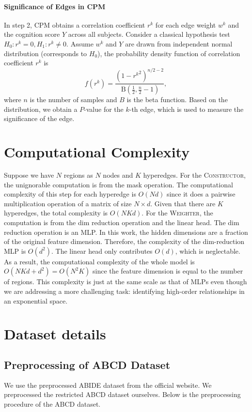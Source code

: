 \paragraph{Significance of Edges in CPM}
In step 2, CPM obtains a correlation coefficient $r^k$ for each edge weight $w^k$ and the cognition score $Y$ across all subjects. Consider a classical hypothesis test $H_0: r^k = 0, H_1: r^k \neq 0$. Assume $w^k$ and $Y$ are drawn from independent normal distribution (corresponds to $H_0$), the probability density function of correlation coefficient $r^k$ is
$$
f(r^k)=\frac{\left(1-{r^k}^2\right)^{n / 2-2}}{\mathrm{~B}\left(\frac{1}{2}, \frac{n}{2}-1\right)},
$$
where $n$ is the number of samples and $B$ is the beta function. Based on the distribution, we obtain a $P$-value for the $k$-th edge, which is used to measure the significance of the edge.

\section{Computational Complexity}
\label{app:complexity}
Suppose we have $N$ regions as $N$ nodes and $K$ hyperedges. For the \textsc{Constructor}, the unignorable computation is from the mask operation. The computational complexity of this step for each hyperedge is $O(Nd)$ since it does a pairwise multiplication operation of a matrix of size $N \times d$. Given that there are $K$ hyperedges, the total complexity is $O(NKd)$. For the \textsc{Weighter}, the computation is from the dim reduction operation and the linear head. The dim reduction operation is an MLP. In this work, the hidden dimensions are a fraction of the original feature dimension. Therefore, the complexity of the dim-reduction MLP is $O(d^2)$. The linear head only contributes $O(d)$, which is neglectable. 
As a result, the computational complexity of the whole model is $O(NKd + d^2) = O(N^2K)$ since the feature dimension is equal to the number of regions. This complexity is just at the same scale as that of MLPs even though we are addressing a more challenging task: identifying high-order relationships in an exponential space.

\section{Dataset details}
\label{app:dataset}
\subsection{Preprocessing of ABCD Dataset}
We use the preprocessed ABIDE dataset from the official website. We preprocessed the restricted ABCD dataset ourselves. Below is the preprocessing procedure of the ABCD dataset.

